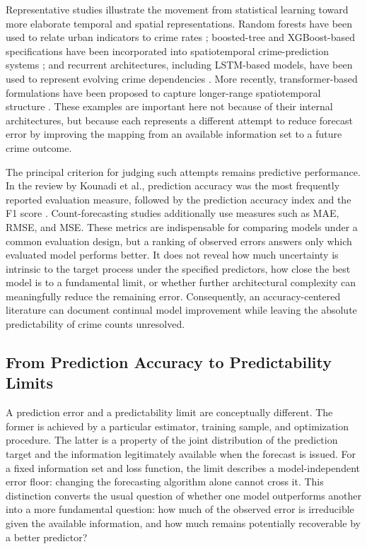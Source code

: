 \documentclass[applsci,article,submit,moreauthors]{Definitions/mdpi}
\begin{document}
Representative studies illustrate the movement from statistical learning
toward more elaborate temporal and spatial representations. Random forests
have been used to relate urban indicators to crime rates
\citep{alves2018crime}; boosted-tree and XGBoost-based specifications have
been incorporated into spatiotemporal crime-prediction systems
\citep{angbera2023model}; and recurrent architectures, including LSTM-based
models, have been used to represent evolving crime dependencies
\citep{huang2018deepcrime}. More recently, transformer-based formulations
have been proposed to capture longer-range spatiotemporal structure
\citep{butt2025start}. These examples are important here not because of
their internal architectures, but because each represents a different
attempt to reduce forecast error by improving the mapping from an available
information set to a future crime outcome.

The principal criterion for judging such attempts remains predictive
performance. In the review by Kounadi et al., prediction accuracy was the
most frequently reported evaluation measure, followed by the prediction
accuracy index and the F1 score \citep{kounadi2020review}. Count-forecasting
studies additionally use measures such as MAE, RMSE, and MSE. These metrics
are indispensable for comparing models under a common evaluation design,
but a ranking of observed errors answers only which evaluated model performs
better. It does not reveal how much uncertainty is intrinsic to the target
process under the specified predictors, how close the best model is to a
fundamental limit, or whether further architectural complexity can
meaningfully reduce the remaining error. Consequently, an accuracy-centered
literature can document continual model improvement while leaving the
absolute predictability of crime counts unresolved.

\subsection{From Prediction Accuracy to Predictability Limits}
\label{subsec:intro_predictability_limits}

A prediction error and a predictability limit are conceptually different.
The former is achieved by a particular estimator, training sample, and
optimization procedure. The latter is a property of the joint distribution
of the prediction target and the information legitimately available when
the forecast is issued. For a fixed information set and loss function, the
limit describes a model-independent error floor: changing the forecasting
algorithm alone cannot cross it. This distinction converts the usual
question of whether one model outperforms another into a more fundamental
question: how much of the observed error is irreducible given the available
information, and how much remains  potentially recoverable by a better
predictor?
\end{document}
